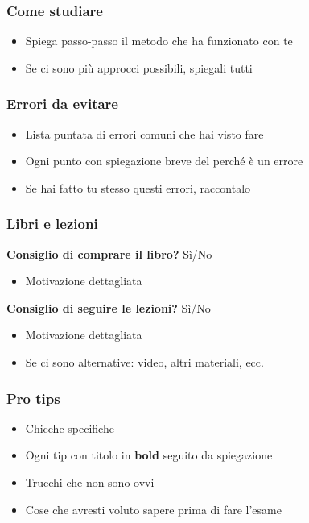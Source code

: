 \documentclass[18pt]{extarticle}
\begin{document}
\subsubsection{Come studiare}
\begin{itemize}
\item Spiega passo-passo il metodo che ha funzionato con te
\item Se ci sono più approcci possibili, spiegali tutti
\end{itemize}

\subsubsection{Errori da evitare}
\begin{itemize}
\item Lista puntata di errori comuni che hai visto fare
\item Ogni punto con spiegazione breve del perché è un errore
\item Se hai fatto tu stesso questi errori, raccontalo
\end{itemize}

\subsubsection{Libri e lezioni}
\textbf{Consiglio di comprare il libro?} Sì/No
\begin{itemize}
\item Motivazione dettagliata
\end{itemize}
\textbf{Consiglio di seguire le lezioni?} Sì/No
\begin{itemize}
\item Motivazione dettagliata
\item Se ci sono alternative: video, altri materiali, ecc.
\end{itemize}

\subsubsection{Pro tips}
\begin{itemize}
\item Chicche specifiche
\item Ogni tip con titolo in \textbf{bold} seguito da spiegazione
\item Trucchi che non sono ovvi
\item Cose che avresti voluto sapere prima di fare l'esame
\end{itemize}
\end{document}
